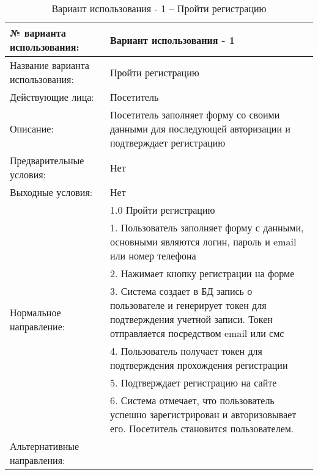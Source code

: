 \begin{table}[H]
  \caption{Вариант использования - 1 – Пройти регистрацию}\label{use-case-1-table}
  \begin{tabular}{|p{6cm}|p{10cm}|}
  \hline № варианта использования: & Вариант использования - 1 \\
  \hline Название варианта использования: & Пройти регистрацию \\
  \hline Действующие лица: & Посетитель \\
  \hline Описание: & Посетитель заполняет форму со своими данными для последующей авторизации и подтверждает регистрацию \\
  \hline Предварительные условия: & Нет \\
  \hline Выходные условия: & Нет \\
  \hline \multirow{7}{*}{Нормальное направление:} & 1.0  Пройти регистрацию \\
  \cline{2-2} & 1. Пользователь заполняет форму с данными, основными являются логин, пароль и email или номер телефона \\
  \cline{2-2} & 2. Нажимает кнопку регистрации на форме \\
  \cline{2-2} & 3. Система создает в БД запись о пользователе и генерирует токен для подтверждения учетной записи. Токен отправляется посредством email или смс \\
  \cline{2-2} & 4. Пользователь получает токен для подтверждения прохождения регистрации \\
  \cline{2-2} & 5. Подтверждает регистрацию на сайте \\
  \cline{2-2} & 6. Система отмечает, что пользователь успешно зарегистрирован и авторизовывает его. Посетитель становится пользователем. \\
  \hline Альтернативные направления: &  \\
  \hline
  \end{tabular}
\end{table}

